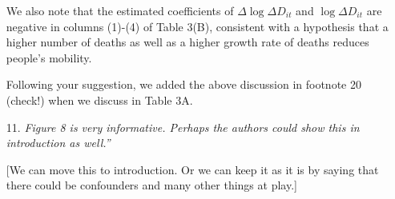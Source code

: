 \documentclass[11pt]{article}
\begin{document}
\begin{itemize}
 We also note that the estimated coefficients of  $\Delta \log\Delta D_{it} $ and $\log\Delta D_{it}$ are negative in columns (1)-(4) of  Table 3(B), consistent with a hypothesis that a higher number of deaths as well as a higher growth rate of deaths reduces people's mobility.
 
Following your suggestion, we added the above discussion in footnote 20 (check!) when we discuss in Table 3A.


\item[11.]  \textit{Figure 8 is very informative. Perhaps the authors could show this in introduction as well.''}

[We can move this to introduction. Or we can keep it as it is by saying that there could be confounders and many other things at play.]
  
  \end{itemize}
  
  
\end{document}
